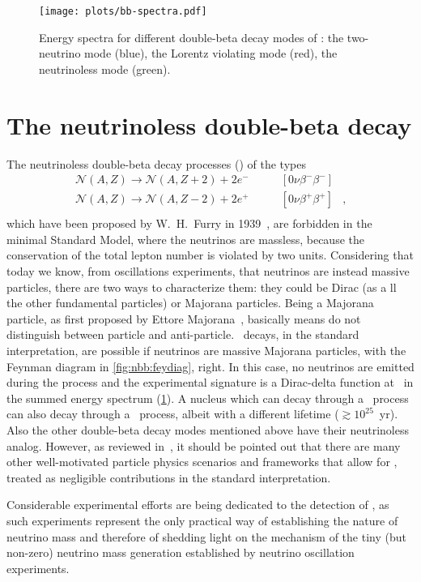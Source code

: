 \begin{figure}
  \centering
  \texttt{[image: plots/bb-spectra.pdf]}
  \caption{%
    Energy spectra for different double-beta decay modes of \gesix: the
    two-neutrino mode (blue), the Lorentz violating mode (red), the
    neutrinoless mode (green).
  }\label{fig:nbb:spectra}
\end{figure}

\section{The neutrinoless double-beta decay}
The neutrinoless double-beta decay processes (\onbb) of the types
\[
  \begin{array}{lrl}
    \mathcal{N}(A,Z)\longrightarrow \mathcal{N}(A,Z+2)+2e^- &
      \qquad [0\nu\beta^-\beta^-] & \\
    \mathcal{N}(A,Z)\longrightarrow \mathcal{N}(A,Z-2)+2e^+ &
      \qquad [0\nu\beta^+\beta^+] & , \\
  \end{array}
\]
which have been proposed by W.~H.~Furry in 1939~\cite{Furry1939}, are
forbidden in the minimal Standard Model, where the neutrinos are massless,
because the conservation of the total lepton number is violated by two units.
Considering that today we know, from oscillations experiments, that neutrinos
are instead massive particles, there are two ways to characterize them: they
could be Dirac (as a ll the other fundamental particles) or Majorana particles.
Being a Majorana particle, as first proposed by Ettore
Majorana~\cite{Majorana1932}, basically means do not distinguish between
particle and anti-particle. \onbb\ decays, in the standard interpretation, are
possible if neutrinos are massive Majorana particles, with the Feynman diagram
in \cref{fig:nbb:feydiag}, right. In this case, no neutrinos are emitted during
the process and the experimental signature is a Dirac-delta function at \qbb\
in the summed energy spectrum (\cref{fig:nbb:spectra}).  A nucleus which can
decay through a \nnbb\ process can also decay through a \onbb\ process, albeit
with a different lifetime ($\gtrsim 10^{25}$~yr). Also the other double-beta
decay modes mentioned above have their neutrinoless analog. However, as
reviewed in~\cite{Rodejohann2011}, it should be pointed out that there are many
other well-motivated particle physics scenarios and frameworks that allow for
\onbb, treated as negligible contributions in the standard interpretation.

Considerable experimental efforts are being dedicated to the detection of
\onbb, as such experiments represent the only practical way of establishing
the nature of neutrino mass and therefore of shedding light on the mechanism of
the tiny (but non-zero) neutrino mass generation established by neutrino
oscillation experiments.

